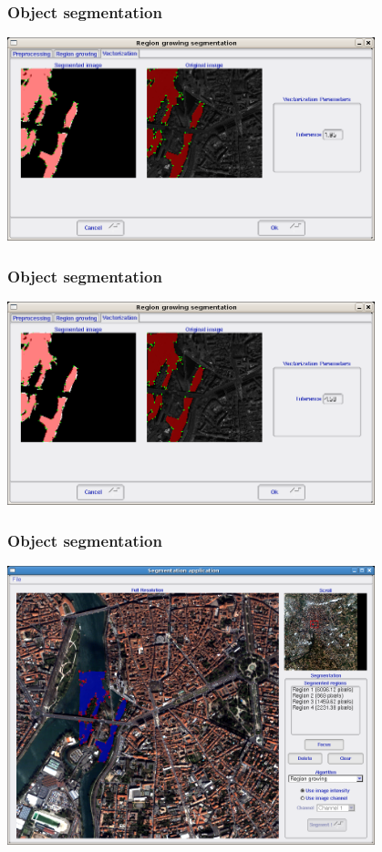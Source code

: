 \documentclass[compress]{beamer}
\begin{document}
\begin{frame}
  \frametitle{Object segmentation}
      \begin{center}
      \includegraphics[width=0.80\textwidth]{Images/seg7.png}
  \end{center}
\end{frame}

\begin{frame}
  \frametitle{Object segmentation}
      \begin{center}
      \includegraphics[width=0.80\textwidth]{Images/seg8.png}
  \end{center}
\end{frame}

\begin{frame}
  \frametitle{Object segmentation}
      \begin{center}
      \includegraphics[width=0.80\textwidth]{Images/seg9.png}
  \end{center}
\end{frame}
\end{document}
